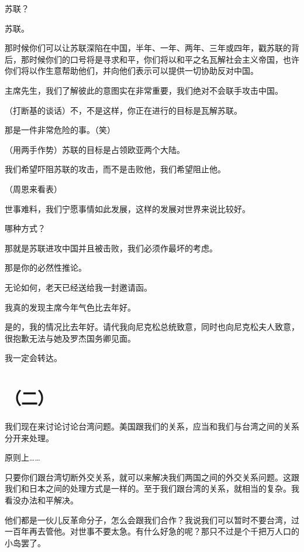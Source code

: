 苏联？

苏联。

那时候你们可以让苏联深陷在中国，半年、一年、两年、三年或四年，戳苏联的背后，那时候你们的口号将是寻求和平，你们将以和平之名瓦解社会主义帝国，也许你们将以作生意帮助他们，并向他们表示可以提供一切协助反对中国。

主席先生，我们了解彼此的意图实在非常重要，我们绝对不会联手攻击中国。

（打断基的谈话）不，不是这样，你正在进行的目标是瓦解苏联。

那是一件非常危险的事。（笑）

（用两手作势）苏联的目标是占领欧亚两个大陆。

我们希望吓阻苏联的攻击，而不是击败他，我们希望阻止他。

（周恩来看表）

世事难料，我们宁愿事情如此发展，这样的发展对世界来说比较好。

哪种方式？

那就是苏联进攻中国并且被击败，我们必须作最坏的考虑。

那是你的必然性推论。

无论如何，老天已经送给我一封邀请函。

我真的发现主席今年气色比去年好。

是的，我的情况比去年好。请代我向尼克松总统致意，同时也向尼克松夫人致意，很抱歉无法与她及罗杰国务卿见面。

我一定会转达。

\date{一九七三年十一月十二日}
\section*{（二）}

我们现在来讨论讨论台湾问题。美国跟我们的关系，应当和我们与台湾之间的关系分开来处理。

原则上……

只要你们跟台湾切断外交关系，就可以来解决我们两国之间的外交关系问题。这跟我们和日本之间的处理方式是一样的。至于我们跟台湾的关系，就相当的复杂。我看没办法和平解决。

他们都是一伙儿反革命分子，怎么会跟我们合作？我说我们可以暂时不要台湾，过一百年再去管他。对世事不要太急。有什么好急的呢？那只不过是个千把万人口的小岛罢了。

